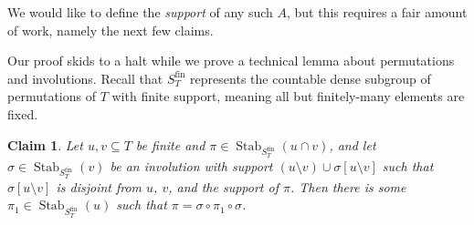 \documentclass[12pt]{amsart}
\theoremstyle{plain}
\newtheorem{claim}{Claim}
\theoremstyle{definition}
\newcommand{\fin}{\text{fin}}
\DeclareMathOperator{\Stab}{Stab}
\begin{document}
We would like to define the \emph{support} of any such $A$, but this requires a fair amount of work, namely the next few claims.

Our proof skids to a halt while we prove a technical lemma about permutations and involutions.
Recall that $S^\fin_T$ represents the countable dense subgroup of permutations of $T$ with finite support, meaning all but finitely-many elements are fixed.

\begin{claim}\label{claim:involution}
Let $u, v \subseteq T$ be finite and $\pi \in \Stab_{S^\fin_T}(u \cap v)$, and let $\sigma \in \Stab_{S^\fin_T}(v)$ be an involution with support $(u \setminus v) \cup \sigma[u \setminus v]$ such that $\sigma[u \setminus v]$ is disjoint from $u$, $v$, and the support of $\pi$.
Then there is some $\pi_1 \in \Stab_{S^\fin_T}(u)$ such that $\pi = \sigma \circ \pi_1 \circ \sigma$.
\end{claim}
\end{document}
